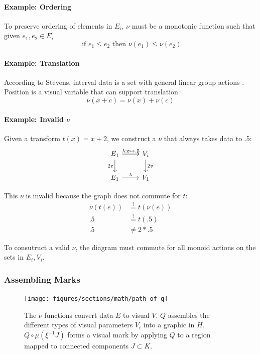 \documentclass[../main.tex]{subfiles}
\begin{document}
\paragraph{Example: Ordering}
To preserve ordering of elements in $E_i$, $\nu$ must be a monotonic function such that given $e_1, e_2 \in E_{i}$
\begin{equation}
\text{ if } e_1 \leq e_2 \text{ then } \nu(e_1) \leq \nu(e_2)
\end{equation}

\paragraph{Example: Translation}
According to Stevens, interval data is a set with general linear group actions \cite{stevensTheoryScalesMeasurement1946,leaFormalizationMeasurementScale}. Position is a visual variable that can support translation 
\begin{equation}
\nu(x + c) = \nu(x) + \nu(c)
\end{equation}


\paragraph{Example: Invalid $\nu$}
Given a transform $t(x) = x+2$, we construct a $\nu$ that always takes data to .5: 
\begin{equation}
    \label{eq:nu_equation_bad}
    \begin{tikzcd}
        E_1 \arrow[r] \arrow[r, "\lambda:e\mapsto.5"] \arrow[d, "2e"'] & V_i \arrow[d, "2v"] \\
        E_1 \arrow[r, "\lambda"]                                        & V_1                 
    \end{tikzcd}
\end{equation}

This $\nu$ is invalid because the graph does not commute for $t$:
\begin{align}
    \nu(t(e)) & \overset{?}{=} t(\nu(e))\\
    .5 & \overset{?}{=} t(.5)\\
    .5 & \neq 2*.5
\end{align}

To consutruct a valid $\nu$, the diagram must commute for all monoid actions on the sets in $E_i, V_i$.


\subsubsection{Assembling Marks}
\begin{figure}[H]
    \texttt{[image: figures/sections/math/path\_of\_q]}
    \label{fig:artist_q}
    \caption{The $\nu$ functions convert data $E$ to visual $V$. $Q$ assembles the different types of visual parameters $V_{i}$ into a graphic in $H$. $Q\circ\mu(\xi^{-1}J)$ forms a visual mark by applying $Q$ to a region mapped to connected components $J \subset K$.}  
\end{figure}
\end{document}
